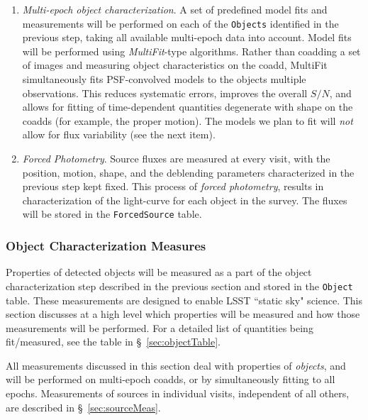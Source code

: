 \documentclass[12pt]{article}
\newcommand{\code}[1]{\texttt{#1}}
\newcommand{\Object}{\code{Object}\xspace}
\newcommand{\Objects}{\code{Objects}\xspace}
\newcommand{\ForcedSource}{\code{ForcedSource}\xspace}
\begin{document}
\begin{enumerate}
    The deblender will make use of all information available at this stage, including the knowledge of peak positions, bands, time, time variability (from Level 1), Galactic longitude and latitude, etc. The output of this stage is a list of (uncharacterized) \Objects\footnote{Depending on the exact implementation of the deblender, this stage may also attach significant metadata (eg, deblended footprints and pixel-weight maps) to each deblended \Object record.}.
    \item {\em Multi-epoch object characterization}. A set of predefined model fits and measurements will be performed on each of the \Objects identified in the previous step, taking all available multi-epoch data into account. Model fits will be performed using {\em MultiFit}-type algorithms. Rather than coadding a set of images and measuring object characteristics on the coadd, MultiFit simultaneously fits PSF-convolved models to the objects multiple observations. This reduces systematic errors, improves the overall $S/N$, and allows for fitting of time-dependent quantities degenerate with shape on the coadds (for example, the proper motion). The models we plan to fit will {\em not} allow for flux variability (see the next item).
    \item {\em Forced Photometry}. Source fluxes are measured at every visit, with the position, motion, shape, and the deblending parameters characterized in the previous step kept fixed. This process of {\em forced photometry}, results in characterization of the light-curve for each object in the survey. The fluxes will be stored in the \ForcedSource table.
\end{enumerate}

\subsubsection{Object Characterization Measures}

Properties of detected objects will be measured as a part of the object characterization step described in the previous section and stored in the \Object table. These measurements are designed to enable LSST ``static sky" science. This section discusses at a high level which properties will be measured and how those measurements will be performed. For a detailed list of quantities being fit/measured, see the table in \S~\ref{sec:objectTable}.

All measurements discussed in this section deal with properties of {\em objects}, and will be performed on multi-epoch coadds, or by simultaneously fitting to all epochs. Measurements of sources in individual visits, independent of all others, are described in \S~\ref{sec:sourceMeas}.
\end{document}
